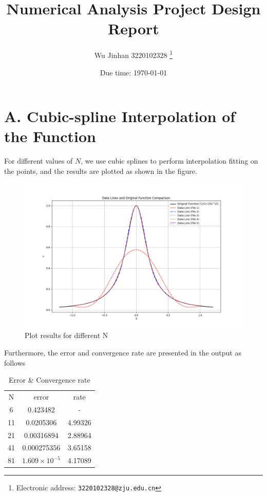 \documentclass[a4paper]{article}
\begin{document}
\nocite{*}
\title{Numerical Analysis Project Design Report}

\author{ Wu Jinhan 3220102328
  \thanks{Electronic address: \texttt{3220102328@zju.edu.cn}}}


\date{Due time: \today}

\maketitle



\section*{A. Cubic-spline Interpolation of the Function}

For different values of \(N\), we use cubic splines to perform interpolation fitting on the points, and the results are plotted as shown in the figure.
\begin{figure}[h]
    \centering
    \includegraphics[width=0.5\linewidth]{../figure/A.png}
    \caption{Plot results for different N}
\end{figure}

Furthermore, the error and convergence rate are presented in the output as follows
\begin{table}[h]
    \centering
    \begin{tabular}{c|c|c}
        N & error & rate\\
        6 & 0.423482 & -\\
        11 & 0.0205306 & 4.99326\\
        21 & 0.00316894 & 2.88964\\
        41 & 0.000275356 & 3.65158\\
        81 & \( 1.609 \times 10^{-5} \) & 4.17089
    \end{tabular}
    \caption{Error \& Convergence rate}
\end{table}
\end{document}
